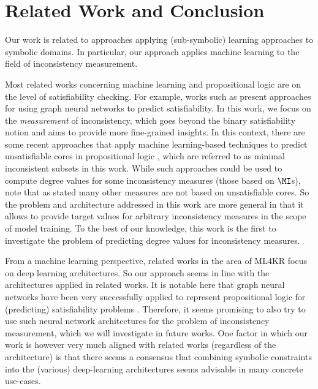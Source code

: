 \section{Related Work and Conclusion}
\label{sec:conclusion}

Our work is related to approaches applying (sub-symbolic) learning approaches to symbolic domains. In particular, our approach applies machine learning to the field of inconsistency measurement.

Most related works concerning machine learning and propositional logic are on the level of satisfiability checking. For example, works such as \cite{cameron2020predicting,bunz2017graph} present approaches for using graph neural networks to predict satisfiability. In this work, we focus on the \emph{measurement} of inconsistency, which goes beyond the binary satisfiability notion and aims to provide more fine-grained insights. In this context, there are some recent approaches that apply machine learning-based techniques to predict unsatisfiable cores in propositional logic \cite{van2020towards,selsam2019guiding,shirokikh2023machine}, which are referred to as minimal inconsistent subsets in this work. While such approaches could be used to compute degree values for some inconsistency measures (those based on $\MI$s), note that as stated many other measures are not based on unsatisfiable cores. So the problem and architecture addressed in this work are more general in that it allows to provide target values for arbitrary inconsistency measures in the scope of model training. To the best of our knowledge, this work is the first to investigate the problem of predicting degree values for inconsistency measures.

From a machine learning perspective, related works in the area of ML4KR focus on deep learning architectures. So our approach seems in line with the architectures applied in related works. It is notable here that graph neural networks have been very successfully applied to represent propositional logic for (predicting) satisfiability problems \cite{cameron2020predicting,bunz2017graph}. Therefore, it seems promising to also try to use such neural network architectures for the problem of inconsistency measurement, which we will investigate in future works. One factor in which our work is however very much aligned with related works (regardless of the architecture) is that there seems a consensus that combining symbolic constraints into the (various) deep-learning architectures seems advisable in many concrete use-cases.

